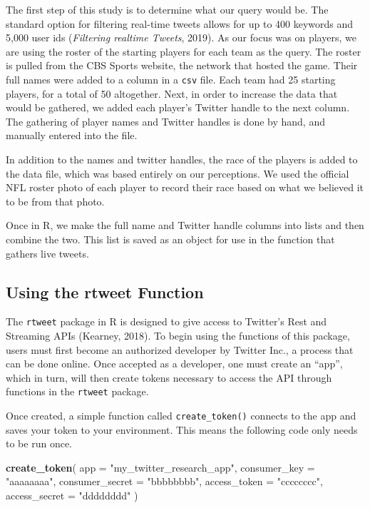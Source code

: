 \documentclass[12pt,twoside]{reedthesis}
\newenvironment{Shaded}{\begin{snugshade}}{\end{snugshade}}
\newcommand{\KeywordTok}[1]{\textcolor[rgb]{0.13,0.29,0.53}{\textbf{#1}}}
\newcommand{\DataTypeTok}[1]{\textcolor[rgb]{0.13,0.29,0.53}{#1}}
\newcommand{\StringTok}[1]{\textcolor[rgb]{0.31,0.60,0.02}{#1}}
\newcommand{\NormalTok}[1]{#1}
\begin{document}
The first step of this study is to determine what our query would be.
The standard option for filtering real-time tweets allows for up to 400
keywords and 5,000 user ids (\emph{Filtering realtime Tweets}, 2019). As
our focus was on players, we are using the roster of the starting
players for each team as the query. The roster is pulled from the CBS
Sports website, the network that hosted the game. Their full names were
added to a column in a \texttt{csv} file. Each team had 25 starting
players, for a total of 50 altogether. Next, in order to increase the
data that would be gathered, we added each player's Twitter handle to
the next column. The gathering of player names and Twitter handles is
done by hand, and manually entered into the file.

In addition to the names and twitter handles, the race of the players is
added to the data file, which was based entirely on our perceptions. We
used the official NFL roster photo of each player to record their race
based on what we believed it to be from that photo.

Once in R, we make the full name and Twitter handle columns into lists
and then combine the two. This list is saved as an object for use in the
function that gathers live tweets.

\subsection{Using the rtweet Function}\label{using-the-rtweet-function}

The \texttt{rtweet} package in R is designed to give access to Twitter's
Rest and Streaming APIs (Kearney, 2018). To begin using the functions of
this package, users must first become an authorized developer by Twitter
Inc., a process that can be done online. Once accepted as a developer,
one must create an ``app'', which in turn, will then create tokens
necessary to access the API through functions in the \texttt{rtweet}
package.

Once created, a simple function called \texttt{create\_token()} connects
to the app and saves your token to your environment. This means the
following code only needs to be run once.

\small
\begin{Shaded}
\begin{Highlighting}[]
\KeywordTok{create_token}\NormalTok{(}
  \DataTypeTok{app =} \StringTok{"my_twitter_research_app"}\NormalTok{,}
  \DataTypeTok{consumer_key =} \StringTok{"aaaaaaaa"}\NormalTok{,}
  \DataTypeTok{consumer_secret =} \StringTok{"bbbbbbbb"}\NormalTok{,}
  \DataTypeTok{access_token =} \StringTok{"cccccccc"}\NormalTok{,}
  \DataTypeTok{access_secret =} \StringTok{"dddddddd"}
\NormalTok{  )}
\end{Highlighting}
\end{Shaded}
\normalsize
\end{document}
